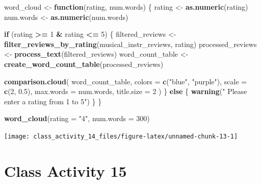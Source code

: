 \documentclass[
]{book}
\newenvironment{Shaded}{\begin{snugshade}}{\end{snugshade}}
\newcommand{\AttributeTok}[1]{\textcolor[rgb]{0.13,0.29,0.53}{#1}}
\newcommand{\ControlFlowTok}[1]{\textcolor[rgb]{0.13,0.29,0.53}{\textbf{#1}}}
\newcommand{\DecValTok}[1]{\textcolor[rgb]{0.00,0.00,0.81}{#1}}
\newcommand{\FloatTok}[1]{\textcolor[rgb]{0.00,0.00,0.81}{#1}}
\newcommand{\FunctionTok}[1]{\textcolor[rgb]{0.13,0.29,0.53}{\textbf{#1}}}
\newcommand{\NormalTok}[1]{#1}
\newcommand{\OtherTok}[1]{\textcolor[rgb]{0.56,0.35,0.01}{#1}}
\newcommand{\SpecialCharTok}[1]{\textcolor[rgb]{0.81,0.36,0.00}{\textbf{#1}}}
\newcommand{\StringTok}[1]{\textcolor[rgb]{0.31,0.60,0.02}{#1}}
\begin{document}
\begin{Shaded}
\begin{Highlighting}[]
\NormalTok{word\_cloud }\OtherTok{\textless{}{-}} \ControlFlowTok{function}\NormalTok{(rating, num.words) \{}
\NormalTok{  rating }\OtherTok{\textless{}{-}} \FunctionTok{as.numeric}\NormalTok{(rating)}
\NormalTok{  num.words }\OtherTok{\textless{}{-}} \FunctionTok{as.numeric}\NormalTok{(num.words)}
  
  \ControlFlowTok{if}\NormalTok{ (rating }\SpecialCharTok{\textgreater{}=} \DecValTok{1} \SpecialCharTok{\&}\NormalTok{ rating }\SpecialCharTok{\textless{}=} \DecValTok{5}\NormalTok{) \{}
\NormalTok{    filtered\_reviews }\OtherTok{\textless{}{-}} \FunctionTok{filter\_reviews\_by\_rating}\NormalTok{(musical\_instr\_reviews, rating)}
\NormalTok{    processed\_reviews }\OtherTok{\textless{}{-}} \FunctionTok{process\_text}\NormalTok{(filtered\_reviews)}
\NormalTok{    word\_count\_table }\OtherTok{\textless{}{-}} \FunctionTok{create\_word\_count\_table}\NormalTok{(processed\_reviews)}
    
    \FunctionTok{comparison.cloud}\NormalTok{(}
\NormalTok{      word\_count\_table,}
      \AttributeTok{colors =} \FunctionTok{c}\NormalTok{(}\StringTok{"blue"}\NormalTok{, }\StringTok{"purple"}\NormalTok{),}
      \AttributeTok{scale =} \FunctionTok{c}\NormalTok{(}\DecValTok{2}\NormalTok{, }\FloatTok{0.5}\NormalTok{),}
      \AttributeTok{max.words =}\NormalTok{ num.words,}
      \AttributeTok{title.size =} \DecValTok{2}
\NormalTok{    )}
\NormalTok{  \} }\ControlFlowTok{else}\NormalTok{ \{}
    \FunctionTok{warning}\NormalTok{(}\StringTok{" Please enter a rating from 1 to 5"}\NormalTok{)}
\NormalTok{  \}}
\NormalTok{\}}

\FunctionTok{word\_cloud}\NormalTok{(}\AttributeTok{rating =} \StringTok{"4"}\NormalTok{, }\AttributeTok{num.words =} \DecValTok{300}\NormalTok{)}
\end{Highlighting}
\end{Shaded}

\texttt{[image: class\_activity\_14\_files/figure-latex/unnamed-chunk-13-1]}

\hypertarget{class-activity-15}{%
\chapter{Class Activity 15}\label{class-activity-15}}
\end{document}

